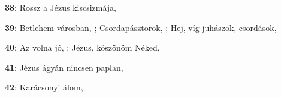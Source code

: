 \begin{minipage}{0.5\textwidth}
\textbf{38}: Rossz a Jézus kiscsizmája, \pageref{RosszaJC3A9zuskiscsizmC3A1ja}
\end{minipage}\vspace{0.1cm}
\begin{minipage}{0.5\textwidth}
\textbf{39}: Betlehem városban, \pageref{BetlehemvC3A1rosban}; Csordapásztorok, \pageref{CsordapC3A1sztorok}; Hej, víg juhászok, csordások, \pageref{Hej2CvC3ADgjuhC3A1szok2CcsordC3A1sok}
\end{minipage}\vspace{0.1cm}
\begin{minipage}{0.5\textwidth}
\textbf{40}: Az volna jó, \pageref{AzvolnajC3B3}; Jézus, köszönöm Néked, \pageref{JC3A9zus2CkC3B6szC3B6nC3B6mNC3A9ked}
\end{minipage}\vspace{0.1cm}
\begin{minipage}{0.5\textwidth}
\textbf{41}: Jézus ágyán nincsen paplan, \pageref{JC3A9zusC3A1gyC3A1nnincsenpaplan}
\end{minipage}\vspace{0.1cm}
\begin{minipage}{0.5\textwidth}
\textbf{42}: Karácsonyi álom, \pageref{KarC3A1csonyiC3A1lom}
\end{minipage}\vspace{0.1cm}
